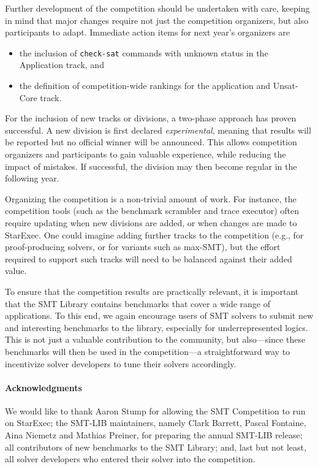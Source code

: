 \documentclass[dvipsnames,table,twoside,11pt]{article}
\begin{document}
Further development of the competition should be undertaken with care,
keeping in mind that major changes require not just the competition
organizers, but also participants to adapt.  Immediate action items
for next year's organizers are
\begin{itemize}
\item the inclusion of {\tt check-sat} commands with unknown status in
  the Application track, and
\item the definition of competition-wide rankings for the application
  and Unsat-Core track.
\end{itemize}

For the inclusion of new tracks or divisions, a two-phase approach has
proven successful.  A new division is first declared
\emph{experimental}, meaning that results will be reported but no
official winner will be announced.  This allows competition organizers
and participants to gain valuable experience, while reducing the
impact of mistakes.  If successful, the division may then become
regular in the following year.

Organizing the competition is a non-trivial amount of work.  For
instance, the competition tools (such as the benchmark scrambler and
trace executor) often require updating when new divisions are added,
or when changes are made to StarExec.  One could imagine adding
further tracks to the competition (e.g., for proof-producing solvers,
or for variants such as max-SMT), but the effort required to support
such tracks will need to be balanced against their added value.

To ensure that the competition results are practically relevant, it is
important that the SMT Library contains benchmarks that cover a wide
range of applications.  To this end, we again encourage users of SMT
solvers to submit new and interesting benchmarks to the library,
especially for underrepresented logics.  This is not just a valuable
contribution to the community, but also---since these benchmarks will
then be used in the competition---a straightforward way to incentivize
solver developers to tune their solvers accordingly.

\paragraph{Acknowledgments}

We would like to thank Aaron Stump for allowing the SMT Competition to
run on StarExec; the SMT-LIB maintainers, namely Clark Barrett, Pascal
Fontaine, Aina Niemetz and Mathias Preiner, for preparing the annual
SMT-LIB release; all contributors of new benchmarks to the SMT
Library; and, last but not least, all solver developers who entered
their solver into the competition.




\end{document}
